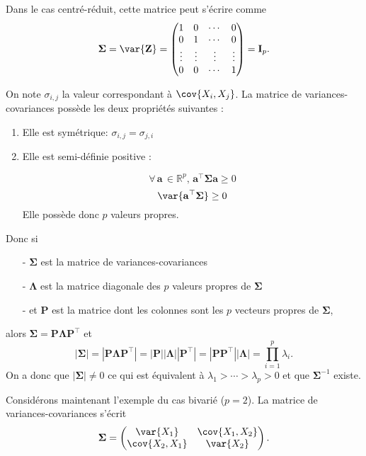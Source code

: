 Dans le cas centré-réduit, cette matrice peut s'écrire comme
$$
\boldsymbol{\Sigma} = \var{\mathbf{Z}} = 
\begin{pmatrix}
1 & 0 & \cdots & 0\\
0 & 1 & \cdots & 0\\
\vdots & \vdots & \vdots & \vdots \\
0 & 0 & \cdots & 1\\
\end{pmatrix}
 = \mathbf{I}_p.
$$

On note $\sigma_{i,j}$ la valeur correspondant à $\cov{X_i,X_j}$. La matrice de variances-covariances possède les deux propriétés suivantes :

\begin{enumerate}
	\item Elle est symétrique: $\sigma_{i,j} = \sigma_{j,i}$
	\item Elle est semi-définie positive :
	
		$$\forall \, \mathbf{a} \, \in \mathbb{R}^p, \, \mathbf{a}^\top \boldsymbol{\Sigma} \mathbf{a} \ge 0$$
		$$\var{\mathbf{a}^\top \boldsymbol{\Sigma}} \ge 0$$
		Elle possède donc $p$ valeurs propres.
\end{enumerate}

\noindent Donc si
\begin{itemize}
	\item[-] $\boldsymbol{\Sigma}$ est la matrice de variances-covariances
	\item[-] $\boldsymbol\Lambda$ est la matrice diagonale des $p$ valeurs propres de $\boldsymbol{\Sigma}$
	\item[-] et $\mathbf{P}$ est la matrice dont les colonnes sont les $p$ vecteurs propres de $\boldsymbol{\Sigma}$,
\end{itemize}
alors $\boldsymbol{\Sigma} = \mathbf{P} \boldsymbol{\Lambda} \mathbf{P}^\top$ et
$$
	\left|\boldsymbol{\Sigma}\right| = \left|\mathbf{P} \boldsymbol{\Lambda} \mathbf{P}^\top\right| 
	= \left|\mathbf{P}\right| \left|\boldsymbol{\Lambda}\right| \left|\mathbf{P}^\top\right| 
	= \left|\mathbf{P}\mathbf{P}^\top\right| \left|\boldsymbol{\Lambda}\right| 
	= \prod_{i=1}^p \lambda_i.
$$
On a donc que $\left|\boldsymbol{\Sigma}\right| \ne 0$ ce qui est équivalent à $\lambda_1> \cdots > \lambda_p > 0$ et que $\boldsymbol{\Sigma}^{-1}$ existe.

Considérons maintenant l'exemple du cas bivarié ($p=2$). La matrice de variances-covariances s'écrit
$$ 
\boldsymbol{\Sigma} = 
\begin{pmatrix}
\var{X_1} & \cov{X_1 , X_2} \\
\cov{X_2 , X_1} & \var{X_2} \\
\end{pmatrix}.
$$

